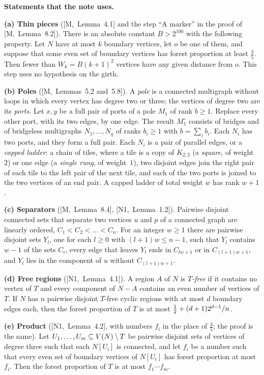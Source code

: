 \documentclass[11pt]{article}
\newcommand{\M}[1]{[M,~#1]}
\newcommand{\N}[1]{[N1,~#1]}
\begin{document}
\begin{fineprint}
\textbf{Statements that the note uses.}

\smallskip
\textbf{(a) Thin pieces} (\M{Lemma~4.1} and the step ``A marker'' in the proof of
\M{Lemma~8.2}). There is an absolute constant $B>2^{100}$ with the following property. Let $N$
have at most $k$ boundary vertices, let $o$ be one of them, and suppose that some even set of
boundary vertices has forest proportion at least $\frac35$. Then fewer than $W_k=B(k+1)^{2}$
vertices have any given distance from $o$. This step uses no hypothesis on the girth.

\smallskip
\textbf{(b) Poles} (\M{Lemmas~5.2 and~5.8}). A \emph{pole} is a connected multigraph without
loops in which every vertex has degree two or three; the vertices of degree two are its
\emph{ports}. Let $x,y$ be a full pair of ports of a pole $M_1$ of rank $b\ge1$. Replace every
other port, with its two edges, by one edge. The result $M_1^{\circ}$ consists of bridges and of
bridgeless multigraphs $N_1,\dots,N_q$ of ranks $b_i\ge1$ with $b=\sum_ib_i$. Each $N_i$ has
two ports, and they form a full pair. Each $N_i$ is a pair of parallel edges, or a \emph{capped
ladder}: a chain of tiles, where a tile is a copy of $K_{2,2}$ (a \emph{square}, of weight~$2$) or
one edge (a \emph{single rung}, of weight~$1$), two disjoint edges join the right pair of each
tile to the left pair of the next tile, and each of the two ports is joined to the two vertices
of an end pair. A capped ladder of total weight $w$ has rank $w+1$.

\smallskip
\textbf{(c) Separators} (\M{Lemma~8.4}, \N{Lemma~1.2}). Pairwise disjoint connected sets that
separate two vertices $u$ and $p$ of a connected graph are linearly ordered,
$C_1<C_2<\dots<C_n$. For an integer $w\ge1$ there are pairwise disjoint sets $Y_l$, one for each
$l\ge0$ with $(l+1)w\le n-1$, such that $Y_l$ contains $w-1$ of the sets $C_i$, every edge that
leaves $Y_l$ ends in $C_{lw+1}$ or in $C_{(l+1)w+1}$, and $Y_l$ lies in the component of $u$
without $C_{(l+1)w+1}$.

\smallskip
\textbf{(d) Free regions} (\N{Lemma~4.1}). A region $A$ of $N$ is \emph{$T$-free} if it contains
no vertex of $T$ and every component of $N-A$ contains an even number of vertices of $T$. If $N$
has $n$ pairwise disjoint $T$-free cyclic regions with at most $d$ boundary edges each, then the
forest proportion of $T$ is at most $\tfrac12+(d+1)2^{d-1}/n$.

\smallskip
\textbf{(e) Product} (\N{Lemma~4.2}, with numbers $f_i$ in the place of $\frac35$; the proof is
the same). Let $U_1,\dots,U_m\subseteq V(N)\setminus T$ be pairwise disjoint sets of vertices of
degree three such that each $N[U_i]$ is connected, and let $f_i$ be a number such that every
even set of boundary vertices of $N[U_i]$ has forest proportion at most $f_i$. Then the forest
proportion of $T$ is at most $f_1\cdots f_m$.


\end{fineprint}
\end{document}
